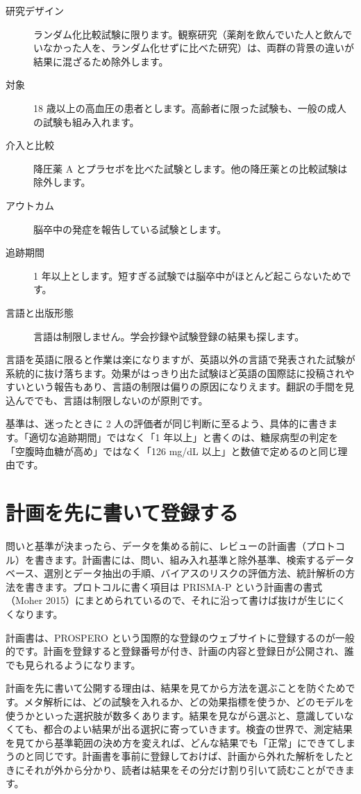 \begin{description}
\item[研究デザイン] ランダム化比較試験に限ります。観察研究（薬剤を飲んでいた人と飲んでいなかった人を、ランダム化せずに比べた研究）は、両群の背景の違いが結果に混ざるため除外します。
\item[対象] 18 歳以上の高血圧の患者とします。高齢者に限った試験も、一般の成人の試験も組み入れます。
\item[介入と比較] 降圧薬 A とプラセボを比べた試験とします。他の降圧薬との比較試験は除外します。
\item[アウトカム] 脳卒中の発症を報告している試験とします。
\item[追跡期間] 1 年以上とします。短すぎる試験では脳卒中がほとんど起こらないためです。
\item[言語と出版形態] 言語は制限しません。学会抄録や試験登録の結果も探します。
\end{description}

言語を英語に限ると作業は楽になりますが、英語以外の言語で発表された試験が系統的に抜け落ちます。効果がはっきり出た試験ほど英語の国際誌に投稿されやすいという報告もあり、言語の制限は偏りの原因になりえます。翻訳の手間を見込んででも、言語は制限しないのが原則です。

基準は、迷ったときに 2 人の評価者が同じ判断に至るよう、具体的に書きます。「適切な追跡期間」ではなく「1 年以上」と書くのは、糖尿病型の判定を「空腹時血糖が高め」ではなく「126 mg/dL 以上」と数値で定めるのと同じ理由です。

\section{計画を先に書いて登録する}
\label{sec:02-4}

問いと基準が決まったら、データを集める前に、レビューの計画書（プロトコル）を書きます。計画書には、問い、組み入れ基準と除外基準、検索するデータベース、選別とデータ抽出の手順、バイアスのリスクの評価方法、統計解析の方法を書きます。プロトコルに書く項目は PRISMA-P という計画書の書式（Moher 2015）にまとめられているので、それに沿って書けば抜けが生じにくくなります。

計画書は、PROSPERO という国際的な登録のウェブサイトに登録するのが一般的です。計画を登録すると登録番号が付き、計画の内容と登録日が公開され、誰でも見られるようになります。

計画を先に書いて公開する理由は、結果を見てから方法を選ぶことを防ぐためです。メタ解析には、どの試験を入れるか、どの効果指標を使うか、どのモデルを使うかといった選択肢が数多くあります。結果を見ながら選ぶと、意識していなくても、都合のよい結果が出る選択に寄っていきます。検査の世界で、測定結果を見てから基準範囲の決め方を変えれば、どんな結果でも「正常」にできてしまうのと同じです。計画書を事前に登録しておけば、計画から外れた解析をしたときにそれが外から分かり、読者は結果をその分だけ割り引いて読むことができます。

